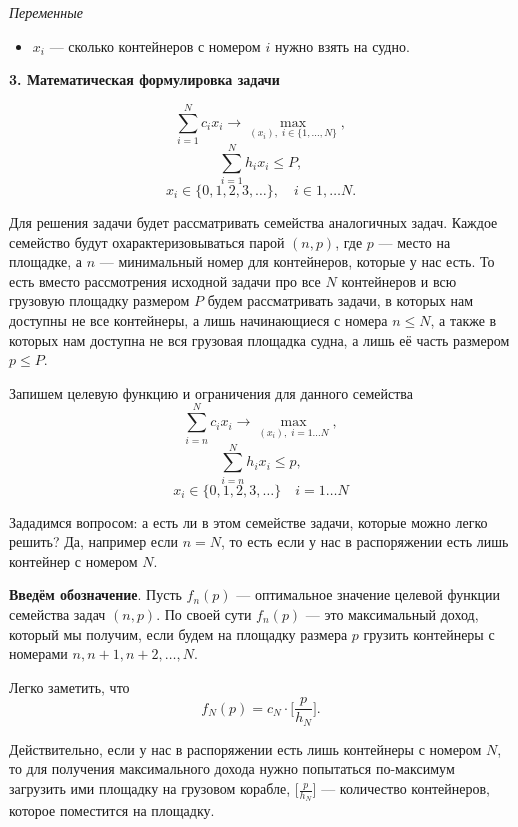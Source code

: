 \bigskip

\textit{Переменные}
\begin{itemize}[nosep]
	\item $x_i$ --- сколько контейнеров с номером $i$ нужно взять на судно.
\end{itemize}

\bigskip

\textbf{3. Математическая формулировка задачи}

\[
\sum_{i=1}^{N} c_i x_i \to \max_{(x_i), \; i \in \{1, \dots, N\}},
\]
\[
\sum_{i=1}^{N} h_i x_i \le P,
\]
\[
x_i \in \{0, 1, 2, 3, \dots\}, \quad i \in {1, \dots N}.
\]

\solution

Для решения задачи будет рассматривать семейства аналогичных задач. Каждое семейство будут охарактеризовываться парой $(n, p)$, где $p$ --- место на площадке, а $n$ --- минимальный номер для контейнеров, которые у нас есть. То есть вместо рассмотрения исходной задачи про все $N$ контейнеров и всю грузовую площадку размером $P$ будем рассматривать задачи, в которых нам доступны не все контейнеры, а лишь начинающиеся с номера $n \le N$, а также в которых нам доступна не вся грузовая площадка судна, а лишь её часть размером $p \le P$.

\begin{figure}[H]
	\centering
	\def\svgwidth{\linewidth}
	\fbox{}
\end{figure}

Запишем целевую функцию и ограничения для данного семейства
\[
\sum_{i=n}^{N} c_i x_i \to \max_{(x_i), \; i=1 \dots N},
\]
\[
\sum_{i=n}^{N} h_i x_i \le p,
\]
\[
x_i \in \{0, 1, 2, 3, \dots\} \quad i = 1 \dots N
\]

Зададимся вопросом: а есть ли в этом семействе задачи, которые можно легко решить? Да, например если $n = N$, то есть если у нас в распоряжении есть лишь контейнер с номером $N$.

\textbf{Введём обозначение}. Пусть $\boxed{f_n(p)}$ --- оптимальное значение целевой функции семейства задач $(n, p)$. По своей сути $f_n(p)$ --- это максимальный доход, который мы получим, если будем на площадку размера $p$ грузить контейнеры с номерами $n, n+1, n+2, \dots, N$.

Легко заметить, что
\[
f_N(p) = c_N \cdot \bigg[\frac{p}{h_N}\bigg].
\]

Действительно, если у нас в распоряжении есть лишь контейнеры с номером $N$, то для получения максимального дохода нужно попытаться по-максимум загрузить ими площадку на грузовом корабле, $\big[\frac{p}{h_N}\big]$ --- количество контейнеров, которое поместится на площадку.

